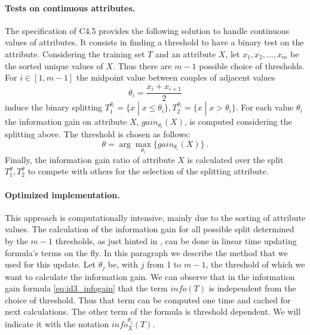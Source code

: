 \documentclass[12pt]{article}
\begin{document}
\paragraph{Tests on continuous attributes.} The specification of C4.5 provides the following solution to handle continuous values of attributes.
It consists in finding a threshold to have a binary test on the attribute.
Considering the training set $T$ and an attribute $X$, let $x_1, x_2, \dots, x_m$ be the sorted unique values of $X$.
Thus there are $m-1$ possible choice of thresholds.
%
For $i \in [1, m-1]$ the midpoint value between couples of adjacent values
\begin{equation*}
    \theta_i = \frac{x_i + x_{i+1}}{2}
\end{equation*}
induce the binary splitting $T_1^{\theta_i} = \{ x \; | \; x \le \theta_i\}, T_2^{\theta_i} = \{ x \; | \; x > \theta_i\}$.
For each value $\theta_i$ the information gain on attribute $X$, $gain_{\theta_i}(X)$, is computed considering the splitting above.
The threshold is chosen as follows:
\begin{equation*}
    \theta = \arg\max_{\theta_i} \{ gain_{\theta_i}(X) \} \ .
\end{equation*}
Finally, the information gain ratio of attribute $X$ is calculated over the split $T_1^{\theta}, T_2^{\theta}$ to compete with others for the selection of the splitting attribute.

\paragraph{Optimized implementation.}
This approach is computationally intensive, mainly due to the sorting of attribute values.
The calculation of the information gain for all possible split determined by the $m-1$ thresholds, as just hinted in \cite{C4.5}, can be done in linear time updating formula's terms on the fly. In this paragraph we describe the method that we used for this update.
%
Let $\theta_j$ be, with $j$ from 1 to $m-1$, the threshold of which we want to calculate the information gain.
We can observe that in the information gain formula \ref{eq:id3_infogain} that the term $info(T)$ is independent from the choice of threshold. Thus that term can be computed one time and cached for next calculations.
%
The other term of the formula is threshold dependent. We will indicate it with the notation $info_X^{\theta_j}(T)$.
\end{document}
